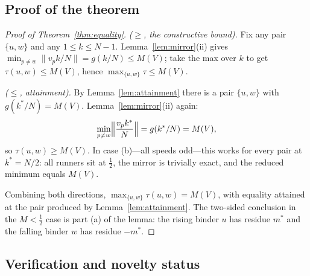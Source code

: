 \subsection{Proof of the theorem}

\begin{proof}[Proof of Theorem~\ref{thm:equality}]
\emph{($\ge$, the constructive bound).} Fix any pair $\{u,w\}$ and any
$1\le k\le N-1$. Lemma~\ref{lem:mirror}(ii) gives
$\min_{p\ne w}\lVert v_p k/N\rVert=g(k/N)\le M(V)$; take the max over
$k$ to get $\tau(u,w)\le M(V)$, hence
$\max_{\{u,w\}}\tau\le M(V)$.

\emph{($\le$, attainment).} By Lemma~\ref{lem:attainment} there is a pair
$\{u,w\}$ with $g(k^\ast/N)=M(V)$. Lemma~\ref{lem:mirror}(ii) again:
\[
\min_{p\ne w}\Bigl\lVert \frac{v_p k^\ast}{N}\Bigr\rVert
=g(k^\ast/N)=M(V),
\]
so $\tau(u,w)\ge M(V)$. In case (b)---all speeds odd---this works for
every pair at $k^\ast=N/2$: all runners sit at $\tfrac12$, the mirror is
trivially exact, and the reduced minimum equals $M(V)$.

Combining both directions, $\max_{\{u,w\}}\tau(u,w)=M(V)$, with equality
attained at the pair produced by Lemma~\ref{lem:attainment}. The
two-sided conclusion in the $M<\tfrac12$ case is part (a) of the lemma:
the rising binder $u$ has residue $m^\ast$ and the falling binder $w$ has
residue $-m^\ast$.
\end{proof}

\subsection{Verification and novelty status}\label{sec:equality-verify}

